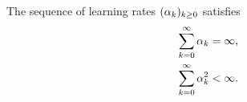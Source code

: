 \begin{definition}
\label{asp: stochastic approximation step size}
The sequence of learning rates $(\alpha_k)_{k\geq0}$ satisfies
\begin{align}
    \label{eq: robbins-monro first}
    \sum_{k = 0}^{\infty} \alpha_{k} &= \infty , 
    \\
    \label{eq: robbins-monro second}
    \sum_{k = 0}^{\infty} \alpha_{k}^2 &< \infty .
\end{align}
\end{definition}